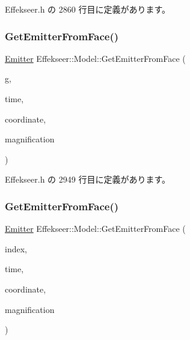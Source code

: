  Effekseer.\+h の 2860 行目に定義があります。

\mbox{\label{class_effekseer_1_1_model_aef7548be4adad150a7f573ac977d89c7}} 
\subsubsection{\texorpdfstring{Get\+Emitter\+From\+Face()}{GetEmitterFromFace()}\hspace{0.1cm}{\footnotesize\ttfamily [1/2]}}
{\footnotesize\ttfamily \mbox{\hyperlink{struct_effekseer_1_1_model_1_1_emitter}{Emitter}} Effekseer\+::\+Model\+::\+Get\+Emitter\+From\+Face (\begin{DoxyParamCaption}\item[{\mbox{\hyperlink{class_effekseer_1_1_i_rand_object}{I\+Rand\+Object}} $\ast$}]{g,  }\item[{int32\+\_\+t}]{time,  }\item[{\mbox{\hyperlink{namespace_effekseer_ac8508f8823c5fcf36aac5d2ddee23765}{Coordinate\+System}}}]{coordinate,  }\item[{float}]{magnification }\end{DoxyParamCaption})\hspace{0.3cm}{\ttfamily [inline]}}



 Effekseer.\+h の 2949 行目に定義があります。

\mbox{\label{class_effekseer_1_1_model_a1bd509af3054aeee73aaf495732e3f4a}} 
\subsubsection{\texorpdfstring{Get\+Emitter\+From\+Face()}{GetEmitterFromFace()}\hspace{0.1cm}{\footnotesize\ttfamily [2/2]}}
{\footnotesize\ttfamily \mbox{\hyperlink{struct_effekseer_1_1_model_1_1_emitter}{Emitter}} Effekseer\+::\+Model\+::\+Get\+Emitter\+From\+Face (\begin{DoxyParamCaption}\item[{int32\+\_\+t}]{index,  }\item[{int32\+\_\+t}]{time,  }\item[{\mbox{\hyperlink{namespace_effekseer_ac8508f8823c5fcf36aac5d2ddee23765}{Coordinate\+System}}}]{coordinate,  }\item[{float}]{magnification }\end{DoxyParamCaption})\hspace{0.3cm}{\ttfamily [inline]}}



